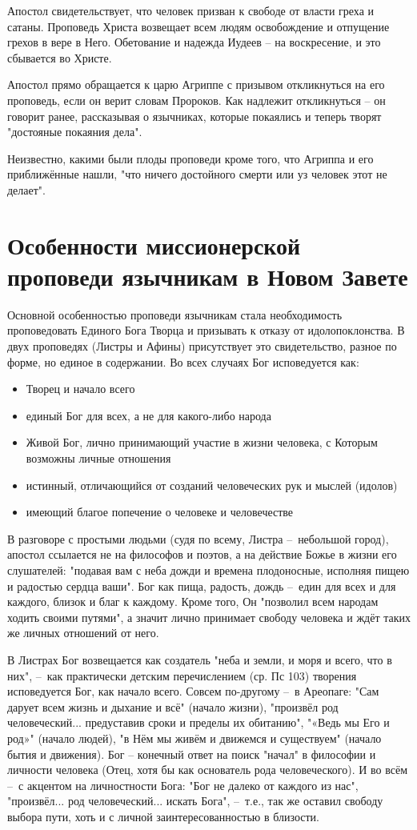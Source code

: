 Апостол свидетельствует, что человек призван к свободе от власти греха и сатаны.
Проповедь Христа возвещает всем людям освобождение и отпущение грехов в вере в Него.
Обетование и надежда Иудеев – на воскресение, и это сбывается во Христе.

Апостол прямо обращается к царю Агриппе с призывом откликнуться на его проповедь, если он верит словам Пророков.
Как надлежит откликнуться – он говорит ранее, рассказывая о язычниках, которые покаялись и теперь творят "достояные покаяния дела".

Неизвестно, какими были плоды проповеди кроме того, что Агриппа и его приближённые нашли, "что ничего достойного смерти или уз человек этот не делает".


\section{Особенности миссионерской проповеди язычникам в Новом Завете}
Основной особенностью проповеди язычникам стала необходимость проповедовать Единого Бога Творца и призывать к отказу от идолопоклонства.
В двух проповедях (Листры и Афины) присутствует это свидетельство, разное по форме, но единое в содержании.
Во всех случаях Бог исповедуется как:  
\begin{itemize}
	\item Творец и начало всего
	\item единый Бог для всех, а не для какого-либо народа
	\item Живой Бог, лично принимающий участие в жизни человека, с Которым возможны личные отношения
	\item истинный, отличающийся от созданий человеческих рук и мыслей (идолов)
	\item имеющий благое попечение о человеке и человечестве
\end{itemize}

В разговоре с простыми людьми (судя по всему, Листра – небольшой город), апостол ссылается не на философов и поэтов, а на действие Божье в жизни его слушателей: "подавая вам с неба дожди и времена плодоносные, исполняя пищею и радостью сердца ваши". 
Бог как пища, радость, дождь – един для всех и для каждого, близок и благ к каждому.
Кроме того, Он "позволил всем народам ходить своими путями", а значит лично принимает свободу человека и ждёт таких же личных отношений от него.


В Листрах Бог возвещается как создатель "неба и земли, и моря и всего, что в них", – как практически детским перечислением (ср. Пс 103) творения исповедуется Бог, как начало всего.
Совсем по-другому – в Ареопаге: "Сам дарует всем жизнь и дыхание и всё" (начало жизни), "произвёл род человеческий... предуставив сроки и пределы их обитанию", "«Ведь мы Его и род»" (начало людей), "в Нём мы живём и движемся и существуем" (начало бытия и движения).
Бог – конечный ответ на поиск "начал" в философии и личности человека (Отец, хотя бы как основатель рода человеческого).
И во всём – с акцентом на личностности Бога: "Бог не далеко от каждого из нас", "произвёл... род человеческий... искать Бога", – т.е., так же оставил свободу выбора пути, хоть и с личной заинтересованностью в близости.


